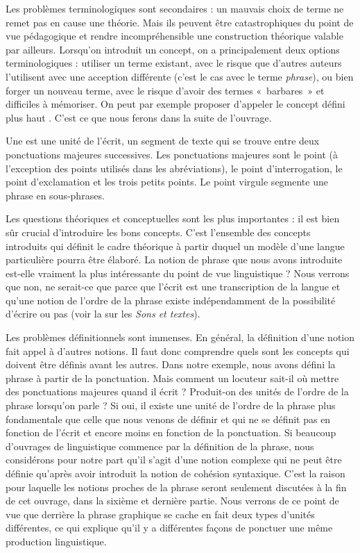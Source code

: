 {    Les problèmes terminologiques sont secondaires : un mauvais choix de terme ne remet pas en cause une théorie. Mais ils peuvent être catastrophiques du point de vue pédagogique et rendre incompréhensible une construction théorique valable par ailleurs. Lorsqu’on introduit un concept, on a principalement deux options terminologiques : utiliser un terme existant, avec le risque que d’autres auteurs l’utilisent avec une acception différente (c’est le cas avec le terme \textit{phrase}), ou bien forger un nouveau terme, avec le risque d’avoir des termes «~barbares~» et difficiles à mémoriser. On peut par exemple proposer d’appeler le concept défini plus haut . C’est ce que nous ferons dans la suite de l’ouvrage.

    Une  est une unité de l’écrit, un segment de texte qui se trouve entre deux ponctuations majeures successives. Les ponctuations majeures sont le point (à l’exception des points utilisés dans les abréviations), le point d’interrogation, le point d’exclamation et les trois petits points. Le point virgule segmente une phrase en sous-phrases.

    Les questions théoriques et conceptuelles sont les plus importantes : il est bien sûr crucial d’introduire les bons concepts. C’est l’ensemble des concepts introduits qui définit le cadre théorique à partir duquel un modèle d’une langue particulière pourra être élaboré. La notion de phrase que nous avons introduite est-elle vraiment la plus intéressante du point de vue linguistique ? Nous verrons que non, ne serait-ce que parce que l’écrit est une transcription de la langue et qu’une notion de l’ordre de la phrase existe indépendamment de la possibilité d’écrire ou pas (voir la  sur les \textit{Sons et textes}).

    Les problèmes définitionnels sont immenses. En général, la définition d’une notion fait appel à d’autres notions. Il faut donc comprendre quels sont les concepts qui doivent être définis avant les autres. Dans notre exemple, nous avons défini la phrase à partir de la ponctuation. Mais comment un locuteur sait-il où mettre des ponctuations majeures quand il écrit ? Produit-on des unités de l’ordre de la phrase lorsqu’on parle ? Si oui, il existe une unité de l’ordre de la phrase plus fondamentale que celle que nous venons de définir et qui ne se définit pas en fonction de l’écrit et encore moins en fonction de la ponctuation. Si beaucoup d’ouvrages de linguistique commence par la définition de la phrase, nous considérons pour notre part qu’il s’agit d’une notion complexe qui ne peut être définie qu’après avoir introduit la notion de cohésion syntaxique. C’est la raison pour laquelle les notions proches de la phrase seront seulement discutées à la fin de cet ouvrage, dans la sixième et dernière partie. Nous verrons de ce point de vue que derrière la phrase graphique se cache en fait deux types d’unités différentes, ce qui explique qu’il y a différentes façons de ponctuer une même production linguistique.
}

